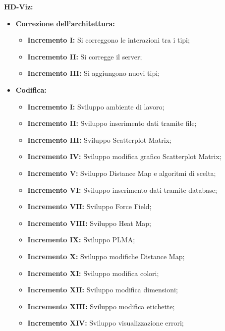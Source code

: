 \documentclass[../piano_di_progetto.tex]{subfiles}
\begin{document}
\textbf{HD-Viz:}
\begin{itemize}
    \item \textbf{Correzione dell'architettura:}
    \begin{itemize}
        \item \textbf{Incremento I:} Si correggono le interazioni tra i tipi;
        \item \textbf{Incremento II:} Si corregge il server;
        \item \textbf{Incremento III:} Si aggiungono nuovi tipi;
    \end{itemize}
    \item \textbf{Codifica:}
    \begin{itemize}        
        \item \textbf{Incremento I:} Sviluppo ambiente di lavoro;
        \item \textbf{Incremento II:} Sviluppo inserimento dati tramite file;
        \item \textbf{Incremento III:} Sviluppo Scatterplot Matrix;
        \item \textbf{Incremento IV:} Sviluppo modifica grafico Scatterplot Matrix;
        \item \textbf{Incremento V:} Sviluppo Distance Map e algoritmi di scelta;
	
        \item \textbf{Incremento VI:} Sviluppo inserimento dati tramite database;
        \item \textbf{Incremento VII:} Sviluppo Force Field;
        \item \textbf{Incremento VIII:} Sviluppo Heat Map;
        \item \textbf{Incremento IX:} Sviluppo PLMA;
        \item \textbf{Incremento X:} Sviluppo modifiche Distance Map;
        \item \textbf{Incremento XI:} Sviluppo modifica colori;
        \item \textbf{Incremento XII:} Sviluppo modifica dimensioni;
        \item \textbf{Incremento XIII:} Sviluppo modifica etichette;
        \item \textbf{Incremento XIV:} Sviluppo visualizzazione errori;

    \end{itemize}
\end{itemize}
\end{document}
